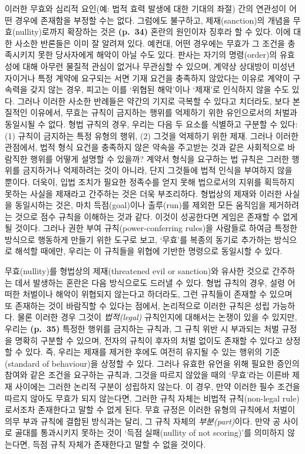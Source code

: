 \documentclass[12pt, oneside]{book}  %
\begin{document}
이러한 무효와 심리적 요인(예: 법적 효력 발생에 대한 기대의 좌절) 간의
연관성이 어떤 경우에 존재함을 부정할 수는 없다. 그럼에도 불구하고,
제재(sanction)의 개념을 무효(nullity)로까지 확장하는 것은
\textbf{(p.~34)} 혼란의 원인이자 징후라 할 수 있다. 이에 대한 사소한
반론들은 이미 잘 알려져 있다. 예컨대, 어떤 경우에는 무효가 그 조건을
충족시키지 못한 당사자에게 해악이 아닐 수도 있다. 판사는 자기의
명령(order)의 유효성에 대해 아무런 물질적 관심이 없거나 무관심할 수
있으며, 계약상 상대방이 미성년자이거나 특정 계약에 요구되는 서면 기재
요건을 충족하지 않았다는 이유로 계약이 구속력을 갖지 않는 경우, 피고는
이를 `위협된 해악'이나 `제재'로 인식하지 않을 수도 있다. 그러나 이러한
사소한 반례들은 약간의 기지로 극복할 수 있다고 치더라도, 보다 본질적인
이유에서, 무효는 규칙이 금지하는 행위를 억제하기 위한 유인으로서의
처벌과 동일시될 수 없다. 형법 규칙의 경우, 우리는 다음 두 요소를
식별하고 구분할 수 있다: (1) 규칙이 금지하는 특정 유형의 행위, (2)
그것을 억제하기 위한 제재. 그러나 이러한 관점에서, 법적 형식 요건을
충족하지 않은 약속을 주고받는 것과 같은 사회적으로 바람직한 행위를
어떻게 설명할 수 있을까? 계약서 형식을 요구하는 법 규칙은 그러한 행위를
금지하거나 억제하려는 것이 아니라, 단지 그것들에 법적 인식을 부여하지
않을 뿐이다. 더욱이, 입법 조치가 필요한 정족수를 얻지 못해 법으로서의
지위를 획득하지 못하는 사실을 제재라고 간주하는 것은 더욱 부조리하다.
형법상의 제재와 이러한 사실을 동일시하는 것은, 마치 득점(goal)이나
출루(run)를 제외한 모든 움직임을 제거하려는 것으로 점수 규칙을 이해하는
것과 같다. 이것이 성공한다면 게임은 존재할 수 없게 될 것이다. 그러나
권한 부여 규칙(power-conferring rules)을 사람들로 하여금 특정한 방식으로
행동하게 만들기 위한 도구로 보고, `무효'를 복종의 동기로 추가하는
방식으로 해석할 때에만, 우리는 이 규칙들을 위협에 기반한 명령으로
동일시할 수 있다.

무효(nullity)를 형법상의 제재(threatened evil or sanction)와 유사한
것으로 간주하는 데서 발생하는 혼란은 다음 방식으로도 드러낼 수 있다.
형법 규칙의 경우, 설령 어떠한 처벌이나 해악이 위협되지 않는다고
하더라도, 그런 규칙들이 존재할 수 있으며 또 존재하는 것이 바람직할 수
있다는 점에서, 논리적으로 이러한 규칙은 성립 가능하다. 물론 이러한 경우
그것이 \emph{법적(legal)} 규칙인지에 대해서는 논쟁이 있을 수 있지만,
우리는 \textbf{(p.~35)} 특정한 행위를 금지하는 규칙과, 그 규칙 위반 시
부과되는 처벌 규정을 명확히 구분할 수 있으며, 전자의 규칙이 후자의 처벌
없이도 존재할 수 있다고 상정할 수 있다. 즉, 우리는 제재를 제거한 후에도
여전히 유지될 수 있는 행위의 기준(standard of behaviour)을 상정할 수
있다. 그러나 유효한 유언을 위해 필요한 증인의 참여와 같은 조건을
요구하는 규칙과, 그것을 따르지 않았을 때의 `무효'라는 이른바 제재
사이에는 그러한 논리적 구분이 성립하지 않는다. 이 경우, 만약 이러한 필수
조건을 따르지 않아도 무효가 되지 않는다면, 그러한 규칙 자체는 비법적
규칙(non-legal rule)로서조차 존재한다고 말할 수 없게 된다. 무효 규정은
이러한 유형의 규칙에서 처벌이 의무 부과 규칙에 결합된 방식과는 달리, 그
규칙 자체의 \emph{부분(part)}이다. 만약 공 사이로 골대를 통과시키지
못하는 것이 `득점 실패(nullity of not scoring)'를 의미하지 않는다면,
득점 규칙 자체가 존재한다고 말할 수 없을 것이다.
\end{document}
